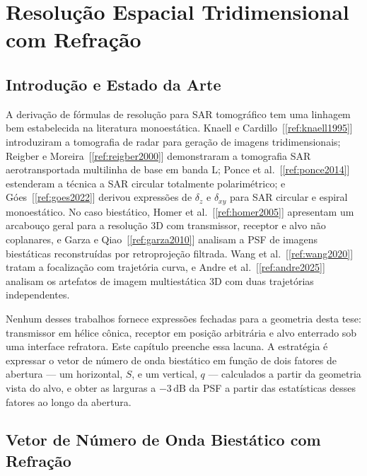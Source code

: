 \documentclass[12pt,a4paper,oneside]{book}
\theoremstyle{remark}
\newcommand{\dB}{\,\mathrm{dB}}
\newcommand{\citar}[1]{[\ref{ref:#1}]}
\theoremstyle{plain}
\theoremstyle{definition}
\begin{document}
\chapter{Resolução Espacial Tridimensional com Refração}
\label{cap:resolucao}

\section{Introdução e Estado da Arte}
\label{sec:res_arte}

A derivação de fórmulas de resolução para SAR tomográfico tem uma linhagem bem
estabelecida na literatura monoestática. Knaell e Cardillo~\citar{knaell1995}
introduziram a tomografia de radar para geração de imagens tridimensionais;
Reigber e Moreira~\citar{reigber2000} demonstraram a tomografia SAR
aerotransportada multilinha de base em banda L; Ponce et al.~\citar{ponce2014}
estenderam a técnica a SAR circular totalmente polarimétrico; e
Góes~\citar{goes2022} derivou expressões de $\delta_z$ e $\delta_{xy}$ para SAR
circular e espiral monoestático. No caso biestático, Homer et
al.~\citar{homer2005} apresentam um arcabouço geral para a resolução 3D com
transmissor, receptor e alvo não coplanares, e Garza e Qiao~\citar{garza2010}
analisam a PSF de imagens biestáticas reconstruídas por retroprojeção filtrada.
Wang et al.~\citar{wang2020} tratam a focalização com trajetória curva, e
Andre et al.~\citar{andre2025} analisam os artefatos de imagem multiestática 3D
com duas trajetórias independentes.

Nenhum desses trabalhos fornece expressões fechadas para a geometria desta
tese: transmissor em hélice cônica, receptor em posição arbitrária e alvo
enterrado sob uma interface refratora. Este capítulo preenche essa lacuna.
A estratégia é expressar o vetor de número de onda biestático em função de dois
fatores de abertura --- um horizontal, $S$, e um vertical, $q$ --- calculados a
partir da geometria vista do alvo, e obter as larguras a $-3\dB$ da PSF a
partir das estatísticas desses fatores ao longo da abertura.

\section{Vetor de Número de Onda Biestático com Refração}
\label{sec:k_bist}
\end{document}
